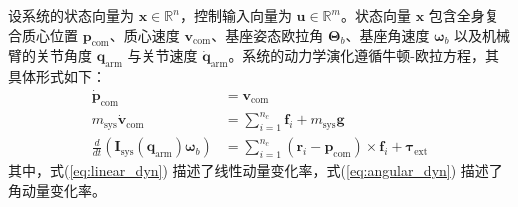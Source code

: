 设系统的状态向量为 $\mathbf{x} \in \mathbb{R}^n$，控制输入向量为 $\mathbf{u} \in \mathbb{R}^m$。状态向量 $\mathbf{x}$ 包含全身复合质心位置 $\mathbf{p}_{\text{com}}$、质心速度 $\mathbf{v}_{\text{com}}$、基座姿态欧拉角 $\boldsymbol{\Theta}_b$、基座角速度 $\boldsymbol{\omega}_b$ 以及机械臂的关节角度 $\mathbf{q}_{\text{arm}}$ 与关节速度 $\dot{\mathbf{q}}_{\text{arm}}$。系统的动力学演化遵循牛顿-欧拉方程，其具体形式如下：
\begin{subequations}
    \begin{align}
        \dot{\mathbf{p}}_{\text{com}}                                                                      & = \mathbf{v}_{\text{com}}                                                                                                               \\
        m_{\text{sys}} \dot{\mathbf{v}}_{\text{com}}                                                       & = \sum_{i=1}^{n_c} \mathbf{f}_i + m_{\text{sys}} \mathbf{g} \label{eq:linear_dyn}                                                       \\
        \frac{d}{dt} \left( \mathbf{I}_{\text{sys}}(\mathbf{q}_{\text{arm}}) \boldsymbol{\omega}_b \right) & = \sum_{i=1}^{n_c} (\mathbf{r}_i - \mathbf{p}_{\text{com}}) \times \mathbf{f}_i + \boldsymbol{\tau}_{\text{ext}} \label{eq:angular_dyn}
    \end{align}
\end{subequations}
其中，式(\ref{eq:linear_dyn}) 描述了线性动量变化率，式(\ref{eq:angular_dyn}) 描述了角动量变化率。

